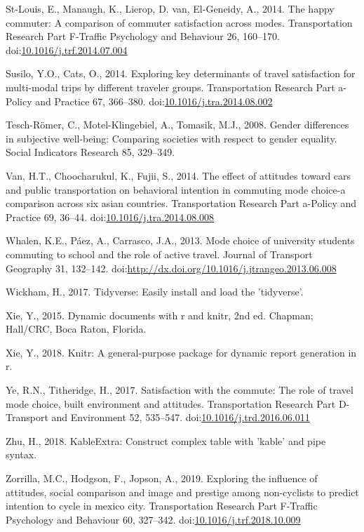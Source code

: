 \documentclass[]{elsarticle} %
\begin{document}
\leavevmode\hypertarget{ref-Stlouis2014happy}{}%
St-Louis, E., Manaugh, K., Lierop, D. van, El-Geneidy, A., 2014. The
happy commuter: A comparison of commuter satisfaction across modes.
Transportation Research Part F-Traffic Psychology and Behaviour 26,
160--170.
doi:\href{https://doi.org/10.1016/j.trf.2014.07.004}{10.1016/j.trf.2014.07.004}

\leavevmode\hypertarget{ref-Susilo2014exploring}{}%
Susilo, Y.O., Cats, O., 2014. Exploring key determinants of travel
satisfaction for multi-modal trips by different traveler groups.
Transportation Research Part a-Policy and Practice 67, 366--380.
doi:\href{https://doi.org/10.1016/j.tra.2014.08.002}{10.1016/j.tra.2014.08.002}

\leavevmode\hypertarget{ref-Tesch2008gender}{}%
Tesch-Römer, C., Motel-Klingebiel, A., Tomasik, M.J., 2008. Gender
differences in subjective well-being: Comparing societies with respect
to gender equality. Social Indicators Research 85, 329--349.

\leavevmode\hypertarget{ref-Van2014effect}{}%
Van, H.T., Choocharukul, K., Fujii, S., 2014. The effect of attitudes
toward cars and public transportation on behavioral intention in
commuting mode choice-a comparison across six asian countries.
Transportation Research Part a-Policy and Practice 69, 36--44.
doi:\href{https://doi.org/10.1016/j.tra.2014.08.008}{10.1016/j.tra.2014.08.008}

\leavevmode\hypertarget{ref-Whalen2013mode}{}%
Whalen, K.E., Páez, A., Carrasco, J.A., 2013. Mode choice of university
students commuting to school and the role of active travel. Journal of
Transport Geography 31, 132--142.
doi:\href{https://doi.org/http://dx.doi.org/10.1016/j.jtrangeo.2013.06.008}{http://dx.doi.org/10.1016/j.jtrangeo.2013.06.008}

\leavevmode\hypertarget{ref-Wickham2017}{}%
Wickham, H., 2017. Tidyverse: Easily install and load the 'tidyverse'.

\leavevmode\hypertarget{ref-Xie2015}{}%
Xie, Y., 2015. Dynamic documents with r and knitr, 2nd ed. Chapman;
Hall/CRC, Boca Raton, Florida.

\leavevmode\hypertarget{ref-Xie2018}{}%
Xie, Y., 2018. Knitr: A general-purpose package for dynamic report
generation in r.

\leavevmode\hypertarget{ref-Ye2017satisfaction}{}%
Ye, R.N., Titheridge, H., 2017. Satisfaction with the commute: The role
of travel mode choice, built environment and attitudes. Transportation
Research Part D-Transport and Environment 52, 535--547.
doi:\href{https://doi.org/10.1016/j.trd.2016.06.011}{10.1016/j.trd.2016.06.011}

\leavevmode\hypertarget{ref-Zhu2018}{}%
Zhu, H., 2018. KableExtra: Construct complex table with 'kable' and pipe
syntax.

\leavevmode\hypertarget{ref-Zorrilla2019exploring}{}%
Zorrilla, M.C., Hodgson, F., Jopson, A., 2019. Exploring the influence
of attitudes, social comparison and image and prestige among
non-cyclists to predict intention to cycle in mexico city.
Transportation Research Part F-Traffic Psychology and Behaviour 60,
327--342.
doi:\href{https://doi.org/10.1016/j.trf.2018.10.009}{10.1016/j.trf.2018.10.009}
\end{document}
